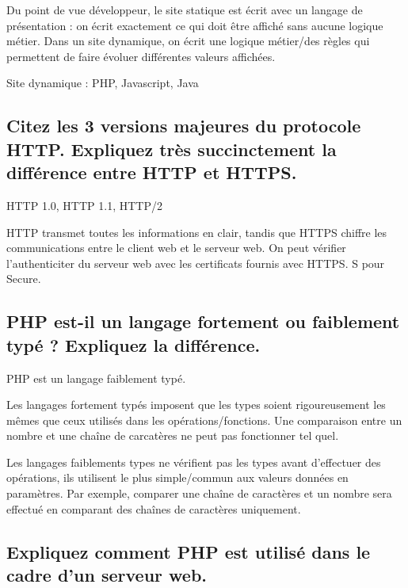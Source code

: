 \documentclass[11pt,a4paper]{article}
\begin{document}
Du point de vue développeur, le site statique est écrit avec un langage de présentation : on écrit exactement ce qui doit être affiché sans aucune logique métier.
Dans un site dynamique, on écrit une logique métier/des règles qui permettent de faire évoluer différentes valeurs affichées.

Site dynamique : PHP, Javascript, Java

\bigskip

\subsection{Citez les 3 versions majeures du protocole HTTP. Expliquez très succinctement la différence entre HTTP et HTTPS.}

\bigskip

HTTP 1.0, HTTP 1.1, HTTP/2

HTTP transmet toutes les informations en clair, tandis que HTTPS chiffre les communications entre le client web et le serveur web.
On peut vérifier l'authenticiter du serveur web avec les certificats fournis avec HTTPS.
S pour Secure.

\bigskip

\subsection{PHP est-il un langage fortement ou faiblement typé ? Expliquez la différence.}

\bigskip

PHP est un langage faiblement typé.

Les langages fortement typés imposent que les types soient rigoureusement les mêmes que ceux utilisés dans les opérations/fonctions.
Une comparaison entre un nombre et une chaîne de carcatères ne peut pas fonctionner tel quel.

Les langages faiblements types ne vérifient pas les types avant d'effectuer des opérations, ils utilisent le plus simple/commun aux valeurs données en paramètres.
Par exemple, comparer une chaîne de caractères et un nombre sera effectué en comparant des chaînes de caractères uniquement.

\bigskip

\subsection{Expliquez comment PHP est utilisé dans le cadre d'un serveur web.}

\bigskip
\end{document}
